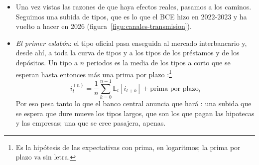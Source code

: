 \documentclass[11pt]{article}
\begin{document}
\begin{itemize}
\item Una vez vistas las razones de que haya efectos reales, pasamos a los caminos. Seguimos una subida de tipos, que es lo que el BCE hizo en 2022-2023 y ha vuelto a hacer en 2026\nocite{BCE2026TiposOficiales} (figura~\ref{figu:canales-transmision}).
\item \emph{El primer eslabón}: el tipo oficial pasa enseguida al mercado interbancario y, desde ahí, a toda la curva de tipos y a los tipos de los préstamos y de los depósitos. Un tipo a $n$ periodos es la media de los tipos a corto que se esperan hasta entonces más una prima por plazo :\footnote{Es la hipótesis de las expectativas con prima, en logaritmos; la prima por plazo va sin letra.}
  \begin{equation}
  i^{(n)}_t=\frac{1}{n}\sum_{k=0}^{n-1}\mathbb{E}_t[i_{t+k}]+\text{prima por plazo}_t \label{eq:tipo-largo}
  \end{equation}
  Por eso pesa tanto lo que el banco central anuncia que hará : una subida que se espera que dure mueve los tipos largos, que son los que pagan las hipotecas y las empresas; una que se cree pasajera, apenas.
\end{itemize}

\begin{infografia}[H]
\centering
\caption{Los canales de transmisión de la política monetaria}\label{figu:canales-transmision}
\end{infografia}
\end{document}
